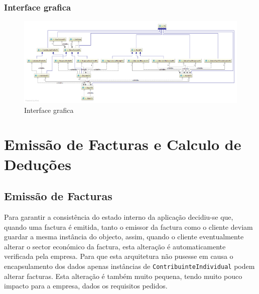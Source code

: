 \documentclass[12pt,a4paper]{report}
\begin{document}
    \subsection{Interface grafica}
    \begin{figure}[H]
        \centering
        \includegraphics[width=\textwidth]{./images/guiFull.png}
        \caption{Interface grafica}
    \end{figure}

\chapter{Emissão de Facturas e Calculo de Deduções}
\label{chp:emissao}

\section{Emissão de Facturas}
    Para garantir a consistência do estado interno da aplicação decidiu-se que,
    quando uma factura é emitida, tanto o emissor da factura como o cliente
    deviam guardar a mesma instância do objecto, assim, quando o cliente
    eventualmente alterar o sector económico da factura, esta alteração é
    automaticamente verificada pela empresa. Para que esta arquitetura não
    pusesse em causa o encapsulamento dos dados apenas instâncias de
    \texttt{ContribuinteIndividual} podem alterar facturas. Esta
    alteração é também muito pequena, tendo muito pouco impacto para a empresa,
    dados os requisitos pedidos.
\end{document}
